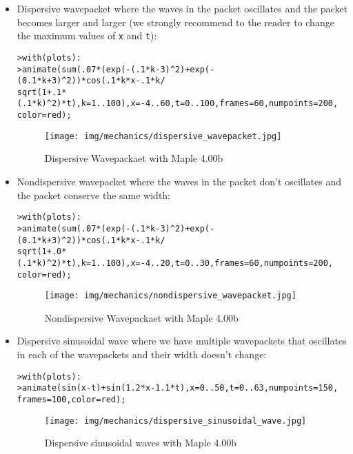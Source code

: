 	\pagebreak
	\begin{itemize}
		\item Dispersive wavepacket where the waves in the packet oscillates and the packet becomes larger and larger (we strongly recommend to the reader to change the maximum values of \texttt{x} and \texttt{t}):
		
		\texttt{>with(plots): \\
				>animate(sum(.07*(exp(-(.1*k-3)\string^2)+exp(-(0.1*k+3)\string^2))*cos(.1*k*x-.1*k/\\
				sqrt(1+.1*(.1*k)\string^2)*t),k=1..100),x=-4..60,t=0..100,frames=60,numpoints=200,\\
				color=red);}		
		\begin{figure}[H]
			\centering
			\texttt{[image: img/mechanics/dispersive\_wavepacket.jpg]}
			\caption{Dispersive Wavepackaet with Maple 4.00b}
		\end{figure}
	
		\item Nondispersive wavepacket where the waves in the packet don't oscillates and the packet conserve the same width:
			
		\texttt{>with(plots): \\
				>animate(sum(.07*(exp(-(.1*k-3)\string^2)+exp(-(0.1*k+3)\string^2))*cos(.1*k*x-.1*k/\\
				sqrt(1+.0*(.1*k)\string^2)*t),k=1..100),x=-4..20,t=0..30,frames=60,numpoints=200,\\
				color=red);}
		\begin{figure}[H]
			\centering
			\texttt{[image: img/mechanics/nondispersive\_wavepacket.jpg]}
			\caption{Nondispersive Wavepackaet with Maple 4.00b}
		\end{figure}
				
		\item Dispersive sinusoidal wave where we have multiple wavepackets that oscillates in each of the wavepackets and their width doesn't change:
		
		\texttt{>with(plots): \\
				>animate(sin(x-t)+sin(1.2*x-1.1*t),x=0..50,t=0..63,numpoints=150,\\
				frames=100,color=red);}
		\begin{figure}[H]
			\centering
			\texttt{[image: img/mechanics/dispersive\_sinusoidal\_wave.jpg]}
			\caption{Dispersive sinusoidal waves with Maple 4.00b}
		\end{figure}


\end{itemize}
